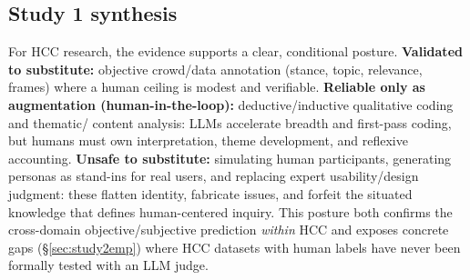 \subsection{Study 1 synthesis}
For HCC research, the evidence supports a clear, conditional posture.
\textbf{Validated to substitute:} objective crowd/data annotation (stance, topic, relevance, frames) where a human
ceiling is modest and verifiable.
\textbf{Reliable only as augmentation (human-in-the-loop):} deductive/inductive qualitative coding and thematic/
content analysis: LLMs accelerate breadth and first-pass coding, but humans must own interpretation, theme
development, and reflexive accounting.
\textbf{Unsafe to substitute:} simulating human participants, generating personas as stand-ins for real users, and
replacing expert usability/design judgment: these flatten identity, fabricate issues, and forfeit the situated
knowledge that defines human-centered inquiry. This posture both confirms the cross-domain objective/subjective prediction
\emph{within} HCC and exposes concrete gaps (\S\ref{sec:study2emp}) where HCC datasets with human labels have never
been formally tested with an LLM judge.

